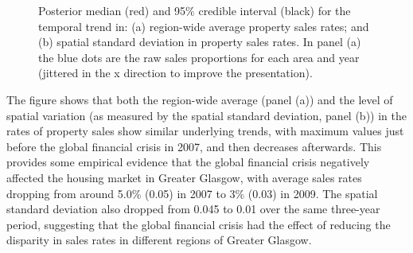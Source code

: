 \documentclass[article, nojss]{jss}
\begin{document}
\begin{figure}
\centering 
{}
\caption{Posterior median (red) and 95\% credible interval (black) for the temporal trend in: (a) region-wide average property sales rates; and (b) spatial standard deviation in property sales rates. In panel (a) the blue dots are the raw sales proportions for each area and year (jittered in the x direction to improve the presentation).\label{salestrend}}
\end{figure} 

The figure shows that both the region-wide average (panel (a)) and the level of spatial variation (as measured by the spatial standard deviation, panel (b)) in the rates of property sales show similar underlying trends, with maximum values just before the global financial crisis in 2007, and then  decreases afterwards. This provides some empirical evidence that the global financial crisis negatively affected the housing market in Greater Glasgow, with average sales rates dropping from around 5.0\% (0.05) in 2007 to 3\% (0.03) in 2009. The spatial standard deviation also dropped from 0.045 to 0.01 over the same three-year period, suggesting that the global financial crisis had the effect of reducing the disparity in sales rates in different regions of Greater Glasgow.




\end{document}
